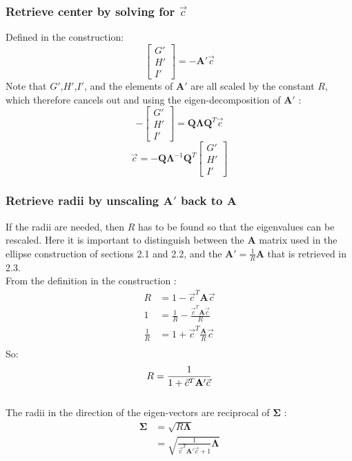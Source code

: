 \documentclass{article}
\def\mat#1{\mathbf{#1}}
\begin{document}
\subsubsection{Retrieve center by solving for $\vec{c}$}
Defined in the construction:
\begin{equation}
\left[\begin{smallmatrix} G'\\H'\\I' \end{smallmatrix}\right] = -\mat{A'}\vec{c}
\end{equation}
Note that $G'$,$H'$,$I'$, and the elements of $\mat{A'}$ are all scaled by the constant $R$, which therefore cancels out and using the eigen-decomposition of $\mat{A'}$ :
\begin{equation}
-\left[\begin{smallmatrix} G'\\H'\\I' \end{smallmatrix}\right] = \mat{Q}\mat{\Lambda}\mat{Q}^{T}\vec{c}
\end{equation}
\begin{equation}
\vec{c} = -\mat{Q}\mat{\Lambda}^{-1}\mat{Q}^{T}\left[\begin{smallmatrix} G'\\H'\\I' \end{smallmatrix}\right] 
\end{equation}
\subsubsection{Retrieve radii by unscaling $\mat{A'}$ back to $\mat{A}$}
If the radii are needed, then $R$ has to be found so that the
eigenvalues can be rescaled. Here it is important to distinguish
between the $\mat{A}$ matrix used in the ellipse construction of
sections 2.1 and 2.2, and the $\mat{A'}=\frac{1}{R}\mat{A}$ that is retrieved in 2.3.
\\
From the definition in the construction :
\begin{equation}
\begin{split}
R &= 1 - \vec{c}^T\mat{A}\vec{c}\\
1 &= \frac{1}{R}-\frac{ \vec{c}^T\mat{A}\vec{c} }{R} \\
\frac{1}{R} &= 1 +  \vec{c}^T\frac{\mat{A}}{R}\vec{c} \\
\end{split}
\end{equation}
So:
\begin{equation}
R = \frac{1}{1 + \vec{c}^T\mat{A'}\vec{c}}\\
\end{equation}
\\
The radii in the direction of the eigen-vectors are reciprocal of $\mat{\Sigma}$ :
\begin{equation}
\begin{split}
\mat{\Sigma} &= \sqrt{R \mat{\Lambda}}\\
&= \sqrt{ \frac{1}{\vec{c}^T\mat{A'}\vec{c} +1} \mat{\Lambda}}
\end{split}
\end{equation}
\end{document}
